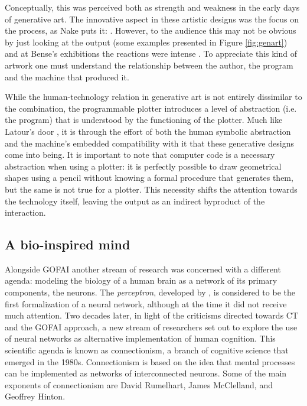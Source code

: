 Conceptually, this was perceived both as strength and weakness in the early days of generative art. The innovative aspect in these artistic designs was the focus on the process, as Nake puts it: . However, to the audience this may not be obvious by just looking at the output (some examples presented in Figure \ref{fig:genart}) and at Bense's exhibitions the reactions were intense \citep{Kluetsch2012}. To appreciate this kind of artwork one must understand the relationship between the author, the program and the machine that produced it. 

While the human-technology relation in generative art is not entirely dissimilar to the  combination, the programmable plotter introduces a level of abstraction (i.e. the program) that is understood by the  functioning of the plotter. Much like Latour's door \citep{Latour1990}, it is through the effort of both the human symbolic abstraction and the machine's embedded compatibility with it that these generative designs come into being. It is important to note that computer code is a necessary abstraction when using a plotter: it is perfectly possible to draw geometrical shapes using a pencil without knowing a formal procedure that generates them, but the same is not true for a plotter. This necessity shifts the attention towards the technology itself, leaving the output as an indirect byproduct of the interaction.

\subsection{A bio-inspired mind}

Alongside GOFAI another stream of research was concerned with a different agenda: modeling the biology of a human brain as a network of its primary components, the neurons. The \emph{perceptron}, developed by \cite{Rosenblatt1958}, is considered to be the first formalization of a neural network, although at the time it did not receive much attention. Two decades later, in light of the criticisms directed towards CT and the GOFAI approach, a new stream of researchers set out to explore the use of neural networks as alternative implementation of human cognition. This scientific agenda is known as connectionism, a branch of cognitive science that emerged in the 1980s. Connectionism is based on the idea that mental processes can be implemented as networks of interconnected neurons. Some of the main exponents of connectionism are David Rumelhart, James McClelland, and Geoffrey Hinton.

